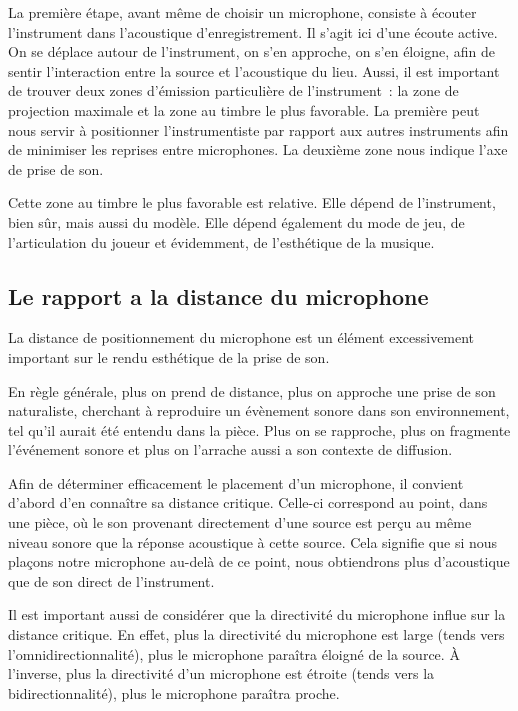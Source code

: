\documentclass[
]{book}
\begin{document}
La première étape, avant même de choisir un microphone, consiste à écouter l'instrument dans l'acoustique d'enregistrement. Il s'agit ici d'une écoute active. On se déplace autour de l'instrument, on s'en approche, on s'en éloigne, afin de sentir l'interaction entre la source et l'acoustique du lieu. Aussi, il est important de trouver deux zones d'émission particulière de l'instrument~: la zone de projection maximale et la zone au timbre le plus favorable. La première peut nous servir à positionner l'instrumentiste par rapport aux autres instruments afin de minimiser les reprises entre microphones. La deuxième zone nous indique l'axe de prise de son.

Cette zone au timbre le plus favorable est relative. Elle dépend de l'instrument, bien sûr, mais aussi du modèle. Elle dépend également du mode de jeu, de l'articulation du joueur et évidemment, de l'esthétique de la musique.

\hypertarget{le-rapport-a-la-distance-du-microphone}{%
\subsection{Le rapport a la distance du microphone}\label{le-rapport-a-la-distance-du-microphone}}

La distance de positionnement du microphone est un élément excessivement important sur le rendu esthétique de la prise de son.

En règle générale, plus on prend de distance, plus on approche une prise de son naturaliste, cherchant à reproduire un évènement sonore dans son environnement, tel qu'il aurait été entendu dans la pièce. Plus on se rapproche, plus on fragmente l'événement sonore et plus on l'arrache aussi a son contexte de diffusion.

Afin de déterminer efficacement le placement d'un microphone, il convient d'abord d'en connaître sa distance critique. Celle-ci correspond au point, dans une pièce, où le son provenant directement d'une source est perçu au même niveau sonore que la réponse acoustique à cette source. Cela signifie que si nous plaçons notre microphone au-delà de ce point, nous obtiendrons plus d'acoustique que de son direct de l'instrument.

Il est important aussi de considérer que la directivité du microphone influe sur la distance critique. En effet, plus la directivité du microphone est large (tends vers l'omnidirectionnalité), plus le microphone paraîtra éloigné de la source. À l'inverse, plus la directivité d'un microphone est étroite (tends vers la bidirectionnalité), plus le microphone paraîtra proche.
\end{document}
